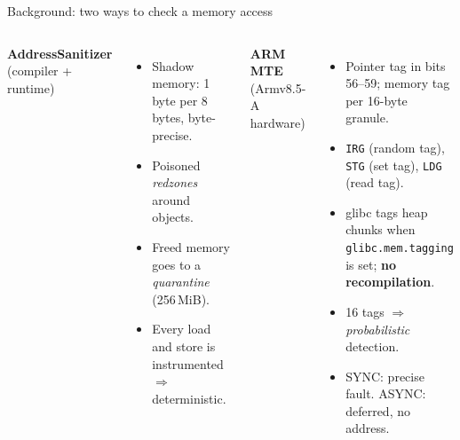 \documentclass[aspectratio=169,11pt]{beamer}
\begin{document}
\begin{frame}{Background: two ways to check a memory access}
\begin{columns}[T]
\textbf{AddressSanitizer} (compiler + runtime)
\begin{itemize}\small\itemsep3pt
\item Shadow memory: 1 byte per 8 bytes, byte-precise.
\item Poisoned \emph{redzones} around objects.
\item Freed memory goes to a \emph{quarantine} (256\,MiB).
\item Every load and store is instrumented $\Rightarrow$ deterministic.
\end{itemize}
\textbf{ARM MTE} (Armv8.5-A hardware)
\begin{itemize}\small\itemsep3pt
\item Pointer tag in bits 56--59; memory tag per 16-byte granule.
\item \texttt{IRG} (random tag), \texttt{STG} (set tag), \texttt{LDG} (read tag).
\item glibc tags heap chunks when \texttt{glibc.mem.tagging} is set; \textbf{no recompilation}.
\item 16 tags $\Rightarrow$ \emph{probabilistic} detection.
\item SYNC: precise fault. ASYNC: deferred, no address.
\end{itemize}
\end{columns}
\vspace{6pt}
\centering
{}
\end{frame}
\end{document}
